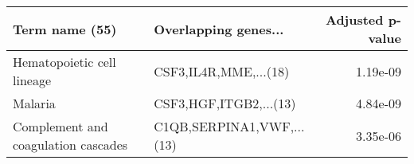 \begin{tabular}{llr}
\toprule
                     Term name (55) &      Overlapping genes... &  Adjusted p-value \\
\midrule
         Hematopoietic cell lineage &     CSF3,IL4R,MME,...(18) &          1.19e-09 \\
                            Malaria &    CSF3,HGF,ITGB2,...(13) &          4.84e-09 \\
Complement and coagulation cascades & C1QB,SERPINA1,VWF,...(13) &          3.35e-06 \\
\bottomrule
\end{tabular}
